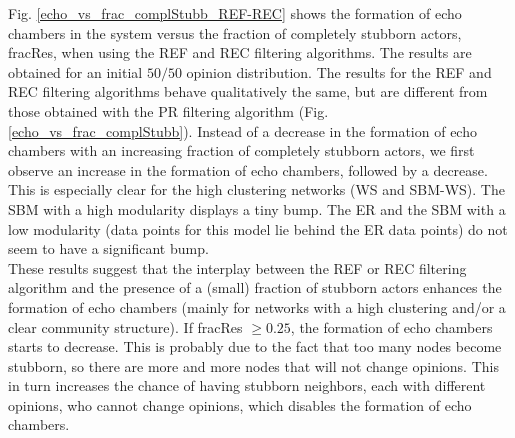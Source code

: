 \documentclass[11 pt , letterpaper , twoside , openright]{book}
\begin{document}
\noindent
Fig. \ref{echo_vs_frac_complStubb_REF-REC} shows the formation of echo chambers in the system versus the fraction of completely stubborn actors, fracRes, when using the REF and REC filtering algorithms. The results are obtained for an initial $50/50$ opinion distribution. The results for the REF and REC filtering algorithms behave qualitatively the same, but are different from those obtained with the PR filtering algorithm (Fig. \ref{echo_vs_frac_complStubb}). Instead of a decrease in the formation of echo chambers with an increasing fraction of completely stubborn actors, we first observe an increase in the formation of echo chambers, followed by a decrease. This is especially clear for the high clustering networks (WS and SBM-WS). The SBM with a high modularity displays a tiny bump. The ER and the SBM with a low modularity (data points for this model lie behind the ER data points) do not seem to have a significant bump.\\
\newline
These results suggest that the interplay between the REF or REC filtering algorithm and the presence of a (small) fraction of stubborn actors enhances the formation of echo chambers (mainly for networks with a high clustering and/or a clear community structure). If fracRes $\geqslant 0.25$, the formation of echo chambers starts to decrease. This is probably due to the fact that too many nodes become stubborn, so there are more and more nodes that will not change opinions. This in turn increases the chance of having stubborn neighbors, each with different opinions, who cannot change opinions, which disables the formation of echo chambers.\\
\newline
\end{document}
